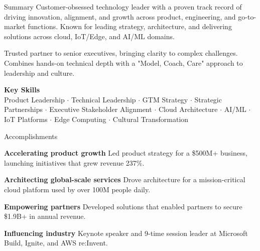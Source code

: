 \documentclass{resume} %
\begin{document}
\vspace{-1.5em}
\begin{rSummary}{Summary}
  Customer-obsessed technology leader with a proven track record of driving innovation, alignment, and growth across product, engineering, and go-to-market functions. Known for leading strategy, architecture, and delivering solutions across cloud, IoT/Edge, and AI/ML domains.
  \par \vspace{.5em}
  Trusted partner to senior executives, bringing clarity to complex challenges. Combines hands-on technical depth with a "Model, Coach, Care" approach to leadership and culture.
  \par \vspace{.75em}
  {\footnotesize \textbf{Key Skills}} \\ 
  \small Product Leadership $\cdot$ Technical Leadership $\cdot$ GTM Strategy $\cdot$ Strategic Partnerships $\cdot$ Executive Stakeholder Alignment $\cdot$ Cloud Architecture $\cdot$ AI/ML $\cdot$ IoT Platforms $\cdot$ Edge Computing $\cdot$ Cultural Transformation
\end{rSummary}
\begin{rAchievements}{Accomplishments}
  \item {\footnotesize\textbf{Accelerating product growth}} \newline Led product strategy for a \$500M+ business, launching initiatives that grew revenue 237\%.
  \item {\footnotesize\textbf{Architecting global-scale services}} \newline Drove architecture for a mission-critical cloud platform used by over 100M people daily.
  \item {\footnotesize\textbf{Empowering partners}} \newline Developed solutions that enabled partners to secure \$1.9B+ in annual revenue.
  \item {\footnotesize\textbf{Influencing industry}} \newline Keynote speaker and 9-time session leader at Microsoft Build, Ignite, and AWS re:Invent.
\end{rAchievements}

\end{document}
